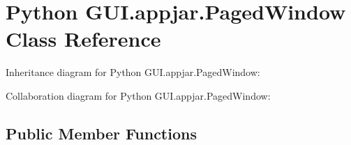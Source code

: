\hypertarget{class_python_01_g_u_i_1_1appjar_1_1_paged_window}{}\section{Python G\+U\+I.\+appjar.\+Paged\+Window Class Reference}
\label{class_python_01_g_u_i_1_1appjar_1_1_paged_window}


Inheritance diagram for Python G\+U\+I.\+appjar.\+Paged\+Window\+:


Collaboration diagram for Python G\+U\+I.\+appjar.\+Paged\+Window\+:
\subsection*{Public Member Functions}
